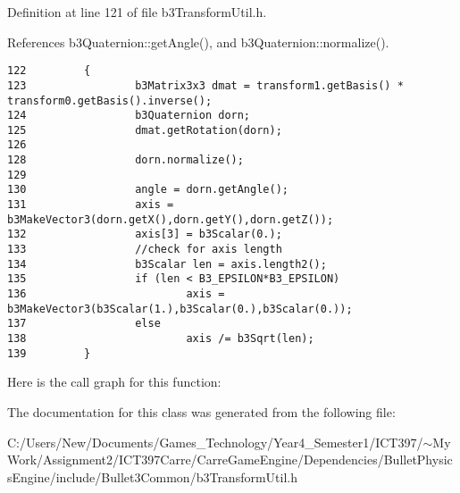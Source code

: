 Definition at line 121 of file b3TransformUtil.h.

References b3Quaternion::getAngle(), and b3Quaternion::normalize().

\begin{Code}\begin{verbatim}122         {
123                 b3Matrix3x3 dmat = transform1.getBasis() * transform0.getBasis().inverse();
124                 b3Quaternion dorn;
125                 dmat.getRotation(dorn);
126 
128                 dorn.normalize();
129                 
130                 angle = dorn.getAngle();
131                 axis = b3MakeVector3(dorn.getX(),dorn.getY(),dorn.getZ());
132                 axis[3] = b3Scalar(0.);
133                 //check for axis length
134                 b3Scalar len = axis.length2();
135                 if (len < B3_EPSILON*B3_EPSILON)
136                         axis = b3MakeVector3(b3Scalar(1.),b3Scalar(0.),b3Scalar(0.));
137                 else
138                         axis /= b3Sqrt(len);
139         }
\end{verbatim}
\end{Code}




Here is the call graph for this function:

The documentation for this class was generated from the following file:\begin{CompactItemize}
\item 
C:/Users/New/Documents/Games\_\-Technology/Year4\_\-Semester1/ICT397/$\sim$My Work/Assignment2/ICT397Carre/CarreGameEngine/Dependencies/BulletPhysicsEngine/include/Bullet3Common/b3TransformUtil.h\end{CompactItemize}
